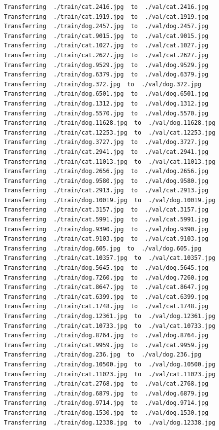 \documentclass[]{book}
\theoremstyle{definition}
\theoremstyle{definition}
\theoremstyle{definition}
\theoremstyle{remark}
\begin{document}
\begin{verbatim}
Transferring  ./train/cat.2416.jpg  to  ./val/cat.2416.jpg
Transferring  ./train/cat.1919.jpg  to  ./val/cat.1919.jpg
Transferring  ./train/dog.2457.jpg  to  ./val/dog.2457.jpg
Transferring  ./train/cat.9015.jpg  to  ./val/cat.9015.jpg
Transferring  ./train/cat.1027.jpg  to  ./val/cat.1027.jpg
Transferring  ./train/cat.2627.jpg  to  ./val/cat.2627.jpg
Transferring  ./train/dog.9529.jpg  to  ./val/dog.9529.jpg
Transferring  ./train/dog.6379.jpg  to  ./val/dog.6379.jpg
Transferring  ./train/dog.372.jpg  to  ./val/dog.372.jpg
Transferring  ./train/dog.6501.jpg  to  ./val/dog.6501.jpg
Transferring  ./train/dog.1312.jpg  to  ./val/dog.1312.jpg
Transferring  ./train/dog.5570.jpg  to  ./val/dog.5570.jpg
Transferring  ./train/dog.11628.jpg  to  ./val/dog.11628.jpg
Transferring  ./train/cat.12253.jpg  to  ./val/cat.12253.jpg
Transferring  ./train/dog.3727.jpg  to  ./val/dog.3727.jpg
Transferring  ./train/cat.2941.jpg  to  ./val/cat.2941.jpg
Transferring  ./train/cat.11013.jpg  to  ./val/cat.11013.jpg
Transferring  ./train/dog.2656.jpg  to  ./val/dog.2656.jpg
Transferring  ./train/dog.9580.jpg  to  ./val/dog.9580.jpg
Transferring  ./train/cat.2913.jpg  to  ./val/cat.2913.jpg
Transferring  ./train/dog.10019.jpg  to  ./val/dog.10019.jpg
Transferring  ./train/cat.3157.jpg  to  ./val/cat.3157.jpg
Transferring  ./train/cat.5991.jpg  to  ./val/cat.5991.jpg
Transferring  ./train/dog.9390.jpg  to  ./val/dog.9390.jpg
Transferring  ./train/cat.9103.jpg  to  ./val/cat.9103.jpg
Transferring  ./train/dog.605.jpg  to  ./val/dog.605.jpg
Transferring  ./train/cat.10357.jpg  to  ./val/cat.10357.jpg
Transferring  ./train/dog.5645.jpg  to  ./val/dog.5645.jpg
Transferring  ./train/dog.7260.jpg  to  ./val/dog.7260.jpg
Transferring  ./train/cat.8647.jpg  to  ./val/cat.8647.jpg
Transferring  ./train/cat.6399.jpg  to  ./val/cat.6399.jpg
Transferring  ./train/cat.1748.jpg  to  ./val/cat.1748.jpg
Transferring  ./train/dog.12361.jpg  to  ./val/dog.12361.jpg
Transferring  ./train/cat.10733.jpg  to  ./val/cat.10733.jpg
Transferring  ./train/dog.8764.jpg  to  ./val/dog.8764.jpg
Transferring  ./train/cat.9959.jpg  to  ./val/cat.9959.jpg
Transferring  ./train/dog.236.jpg  to  ./val/dog.236.jpg
Transferring  ./train/dog.10500.jpg  to  ./val/dog.10500.jpg
Transferring  ./train/cat.11023.jpg  to  ./val/cat.11023.jpg
Transferring  ./train/cat.2768.jpg  to  ./val/cat.2768.jpg
Transferring  ./train/dog.6879.jpg  to  ./val/dog.6879.jpg
Transferring  ./train/dog.9714.jpg  to  ./val/dog.9714.jpg
Transferring  ./train/dog.1530.jpg  to  ./val/dog.1530.jpg
Transferring  ./train/dog.12338.jpg  to  ./val/dog.12338.jpg

\end{verbatim}
\end{document}
